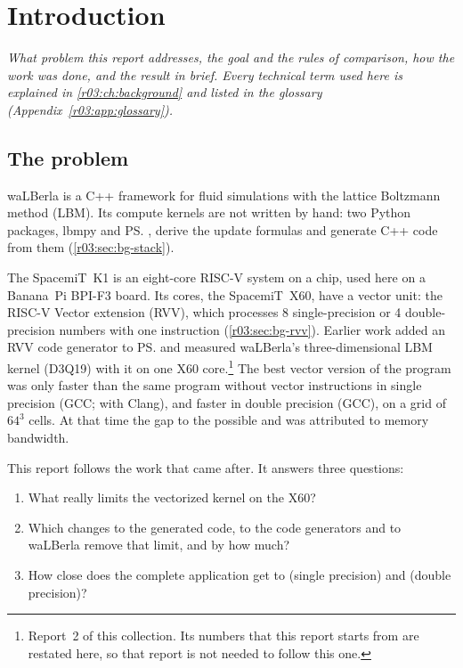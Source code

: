 \chapter{Introduction}\label{r03:ch:intro}

\emph{What problem this report addresses, the goal and the rules of comparison, how the work
was done, and the result in brief. Every technical term used here is explained in
\cref{r03:ch:background} and listed in the glossary (Appendix~\ref{r03:app:glossary}).}

\section{The problem}\label{r03:sec:problem}

waLBerla is a C++ framework for fluid simulations with the lattice Boltzmann method (LBM).
Its compute kernels are not written by hand: two Python packages, lbmpy and \ps{}, derive the
update formulas and generate C++ code from them (\cref{r03:sec:bg-stack}).

The SpacemiT~K1 is an eight-core RISC-V system on a chip, used here on a Banana~Pi BPI-F3
board. Its cores, the SpacemiT~X60, have a vector unit: the RISC-V Vector extension (RVV),
which processes 8 single-precision or 4 double-precision numbers with one instruction
(\cref{r03:sec:bg-rvv}). Earlier work added an RVV code generator to \ps{} and measured
waLBerla's three-dimensional LBM kernel (D3Q19) with it on one X60 core.\footnote{Report~2 of
this collection. Its numbers that this report starts from are restated here, so that report
is not needed to follow this one.} The best vector version of the program was only
 faster than the same program without vector instructions in single precision
(GCC;  with Clang), and  faster in double precision (GCC), on a grid of
$64^3$ cells. At that time the gap to the possible  and  was attributed to
memory bandwidth.

This report follows the work that came after. It answers three questions:
\begin{enumerate}
  \item What really limits the vectorized kernel on the X60?
  \item Which changes to the generated code, to the code generators and to waLBerla remove
        that limit, and by how much?
  \item How close does the complete application get to  (single precision) and
         (double precision)?
\end{enumerate}

